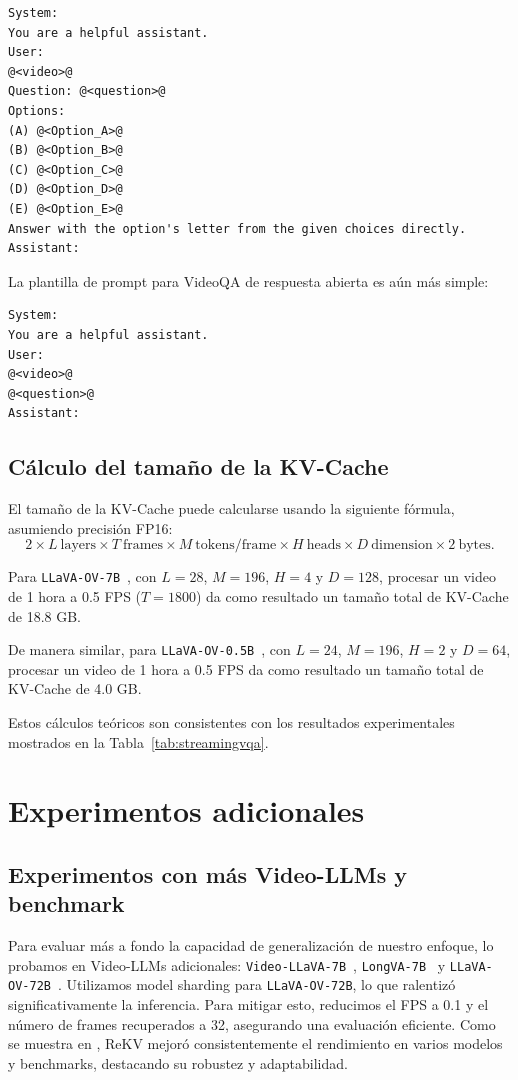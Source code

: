 \begin{lstlisting}
System:
You are a helpful assistant.
User: 
@<video>@
Question: @<question>@
Options:
(A) @<Option_A>@
(B) @<Option_B>@
(C) @<Option_C>@
(D) @<Option_D>@
(E) @<Option_E>@
Answer with the option's letter from the given choices directly.
Assistant:
\end{lstlisting}

La plantilla de prompt para VideoQA de respuesta abierta es aún más simple:

\begin{lstlisting}
System:
You are a helpful assistant.
User: 
@<video>@
@<question>@
Assistant:
\end{lstlisting}

\subsection{Cálculo del tamaño de la KV-Cache}

El tamaño de la KV-Cache puede calcularse usando la siguiente fórmula, asumiendo precisión FP16:
\begin{equation*}
    2 \times L~\text{layers} \times T~\text{frames} \times M~\text{tokens/frame} \times H~\text{heads} \times D~\text{dimension} \times 2~\text{bytes}.
\end{equation*}

Para \texttt{LLaVA-OV-7B}~\citep{llava_onevision}, con $L=28$, $M=196$, $H=4$ y $D=128$, procesar un video de 1 hora a 0.5 FPS ($T=1800$) da como resultado un tamaño total de KV-Cache de 18.8 GB.

De manera similar, para \texttt{LLaVA-OV-0.5B}~\citep{llava_onevision}, con $L=24$, $M=196$, $H=2$ y $D=64$, procesar un video de 1 hora a 0.5 FPS da como resultado un tamaño total de KV-Cache de 4.0 GB.

Estos cálculos teóricos son consistentes con los resultados experimentales mostrados en la Tabla~\ref{tab:streamingvqa}.

\section{Experimentos adicionales}

\subsection{Experimentos con más Video-LLMs y benchmark}

Para evaluar más a fondo la capacidad de generalización de nuestro enfoque, lo probamos en Video-LLMs adicionales: \texttt{Video-LLaVA-7B}~\citep{video_llava}, \texttt{LongVA-7B}~\citep{longva} y \texttt{LLaVA-OV-72B}~\citep{llava_onevision}. Utilizamos model sharding para \texttt{LLaVA-OV-72B}, lo que ralentizó significativamente la inferencia. Para mitigar esto, reducimos el FPS a 0.1 y el número de frames recuperados a 32, asegurando una evaluación eficiente. Como se muestra en , ReKV mejoró consistentemente el rendimiento en varios modelos y benchmarks, destacando su robustez y adaptabilidad.

